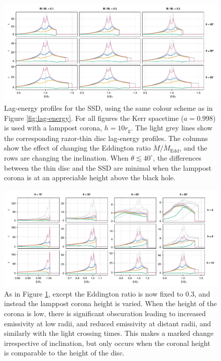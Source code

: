 \documentclass[fleqn,usenatbib]{mnras}
\newcommand{\rg}{r_\text{g}}
\begin{document}
\begin{figure}
    \centering
    \includegraphics[width=0.99\linewidth]{figures/reverberation.thick-disc.pdf}
    \caption{Lag-energy profiles for the SSD, using the same colour scheme as in
        Figure \ref{fig:lag-energy}. For all figures the Kerr spacetime
        ($a=0.998$) is used with a lamppost corona, $h = 10 \rg$. The light grey
        lines show the corresponding razor-thin disc lag-energy profiles. The
        columns show the effect of changing the Eddington ratio $\dot{M} /
        \dot{M}_\text{Edd}$, and the rows are changing the inclination. When
        $\theta \lesssim 40^\circ$, the differences between the thin disc and
        the SSD are minimal when the lamppost corona is at an appreciable height
        above the black hole.}
    \label{fig:reverb-thick-discs}
\end{figure}

\begin{figure}
    \centering
    \includegraphics[width=0.99\linewidth]{figures/reverberation.thick-disc-corona.pdf}
    \caption{As in Figure \ref{fig:reverb-thick-discs}, except the Eddington
        ratio is now fixed to $0.3$, and instead the lamppost corona height is
        varied. When the height of the corona is low, there is significant
        obscuration leading to increased emissivity at low radii, and reduced
        emissivity at distant radii, and similarly with the light crossing
    times. This makes a marked change irrespective of inclination, but only
occurs when the coronal height is comparable to the height of the disc.}
    \label{fig:reverb-thick-discs-corona}
\end{figure}
\end{document}
